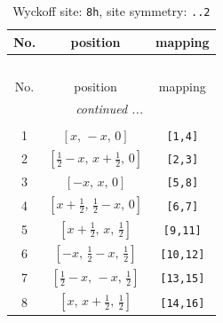 \documentclass[fleqn,8pt]{jsarticle}
\begin{document}
\begin{longtable}{ccc}
\caption{Wyckoff site: {\tt 8h}, site symmetry: {\tt ..2}}
 \\
 \hline \hline
No. & position & mapping \\ \hline \endfirsthead

\multicolumn{2}{l}{\tablename\ \thetable{}} \\
 \hline \hline
No. & position & mapping \\ \hline \endhead

 \hline \hline
\multicolumn{2}{r}{\footnotesize\it continued ...} \\ \endfoot

 \hline \hline
\multicolumn{2}{r}{} \\ \endlastfoot

1 & $\left[ x,\, - x,\, 0 \right]$ & {\tt [1,4]} \\ \hline
2 & $\left[ \frac{1}{2} - x,\, x + \frac{1}{2},\, 0 \right]$ & {\tt [2,3]} \\ \hline
3 & $\left[ - x,\, x,\, 0 \right]$ & {\tt [5,8]} \\ \hline
4 & $\left[ x + \frac{1}{2},\, \frac{1}{2} - x,\, 0 \right]$ & {\tt [6,7]} \\ \hline
5 & $\left[ x + \frac{1}{2},\, x,\, \frac{1}{2} \right]$ & {\tt [9,11]} \\ \hline
6 & $\left[ - x,\, \frac{1}{2} - x,\, \frac{1}{2} \right]$ & {\tt [10,12]} \\ \hline
7 & $\left[ \frac{1}{2} - x,\, - x,\, \frac{1}{2} \right]$ & {\tt [13,15]} \\ \hline
8 & $\left[ x,\, x + \frac{1}{2},\, \frac{1}{2} \right]$ & {\tt [14,16]} \\
\end{longtable}
\renewcommand{\arraystretch}{1.2}
\end{document}
